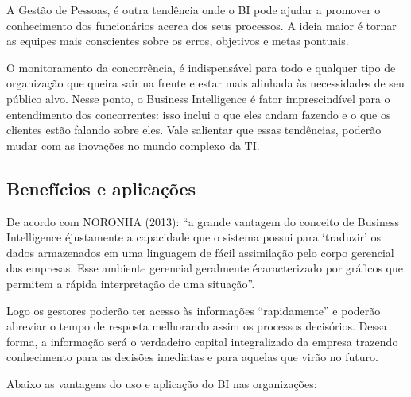 A Gest\~{a}o de Pessoas, \'{e} outra tend\^{e}ncia onde o BI pode ajudar a promover o conhecimento dos funcion\'{a}rios acerca dos seus processos. A ideia maior \'{e} tornar as equipes mais conscientes sobre os erros, objetivos e metas pontuais.

O monitoramento da concorr\^{e}ncia, \'{e} indispens\'{a}vel para todo e qualquer tipo de organiza\c{c}\~{a}o que queira sair na frente e estar mais alinhada \`{a}s necessidades de seu  público alvo. Nesse ponto, o Business Intelligence \'{e} fator imprescind\'{i}vel para o entendimento dos concorrentes: isso inclui o que eles andam fazendo e o que os clientes est\~{a}o falando sobre eles.
Vale salientar que essas tend\^{e}ncias, poder\~{a}o mudar com as inova\c{c}\~{o}es no mundo complexo da TI.

\subsection{Benef\'{i}cios e aplica\c{c}\~{o}es}

De acordo com NORONHA (2013): “a grande vantagem do conceito de Business Intelligence \'{e}justamente a capacidade que o sistema possui para ‘traduzir’ os dados armazenados em uma linguagem de f\'{a}cil assimila\c{c}\~{a}o pelo corpo gerencial das empresas. Esse ambiente gerencial geralmente \'{e}caracterizado por gr\'{a}ficos que permitem a r\'{a}pida interpreta\c{c}\~{a}o de uma situa\c{c}\~{a}o”.

Logo os gestores poder\~{a}o ter acesso \`{a}s informa\c{c}\~{o}es “rapidamente” e poder\~{a}o abreviar o tempo de resposta melhorando assim os processos decis\'{o}rios. Dessa forma, a informa\c{c}\~{a}o ser\'{a} o verdadeiro capital integralizado da empresa trazendo conhecimento para as decis\~{o}es imediatas e para aquelas que vir\~{a}o no futuro.

Abaixo as vantagens do uso e aplica\c{c}\~{a}o do BI nas organiza\c{c}\~{o}es:

